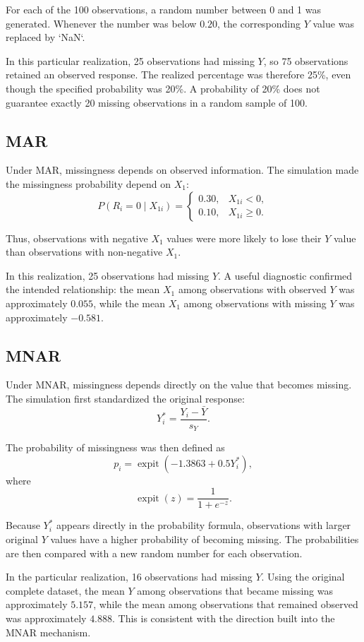 \documentclass[11pt,a4paper]{article}
\begin{document}
For each of the 100 observations, a random number between 0 and 1 was generated. Whenever the number was below $0.20$, the corresponding $Y$ value was replaced by `NaN`.

In this particular realization, 25 observations had missing $Y$, so 75 observations retained an observed response. The realized percentage was therefore 25\%, even though the specified probability was 20\%. A probability of 20\% does not guarantee exactly 20 missing observations in a random sample of 100.

\subsection{MAR}
Under MAR, missingness depends on observed information. The simulation made the missingness probability depend on $X_1$:
\[
P(R_i=0\mid X_{1i})=
\begin{cases}
0.30,&X_{1i}<0,\\
0.10,&X_{1i}\geq 0.
\end{cases}
\]

Thus, observations with negative $X_1$ values were more likely to lose their $Y$ value than observations with non-negative $X_1$.

In this realization, 25 observations had missing $Y$. A useful diagnostic confirmed the intended relationship: the mean $X_1$ among observations with observed $Y$ was approximately $0.055$, while the mean $X_1$ among observations with missing $Y$ was approximately $-0.581$.

\subsection{MNAR}
Under MNAR, missingness depends directly on the value that becomes missing. The simulation first standardized the original response:
\[
Y_i^*=\frac{Y_i-\bar Y}{s_Y}.
\]

The probability of missingness was then defined as
\[
p_i=\operatorname{expit}\left(-1.3863+0.5Y_i^*\right),
\]
where
\[
\operatorname{expit}(z)=\frac{1}{1+e^{-z}}.
\]

Because $Y_i^*$ appears directly in the probability formula, observations with larger original $Y$ values have a higher probability of becoming missing. The probabilities are then compared with a new random number for each observation.

In the particular realization, 16 observations had missing $Y$. Using the original complete dataset, the mean $Y$ among observations that became missing was approximately $5.157$, while the mean among observations that remained observed was approximately $4.888$. This is consistent with the direction built into the MNAR mechanism.
\end{document}
